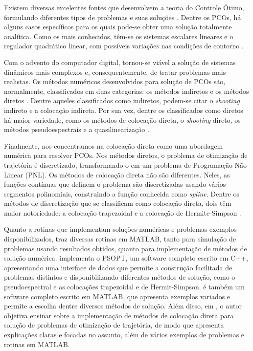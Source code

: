 
Existem diversas excelentes fontes que desenvolvem a teoria do Controle Ótimo, formulando diferentes tipos de problemas e suas soluções \cite{betts_practical_2010, kirk_optimal_2004, bryson_applied_2018, athans_optimal_2007}. Dentre os PCOs, há alguns casos específicos para os quais pode-se obter uma solução totalmente analítica. Como os mais conhecidos, têm-se os sistemas escalares lineares e o regulador quadrático linear, com possíveis variações nas condições de contorno \cite{lewis_optimal_2012}.


Com o advento do computador digital, tornou-se viável a solução de sistemas dinâmicos mais complexos e, consequentemente, de tratar problemas mais realistas. Os métodos numéricos desenvolvidos para solução de PCOs são, normalmente, classificados em duas categorias: os métodos indiretos e os métodos diretos \cite{betts_practical_2010}. Dentre aqueles classificados como indiretos, podem-se citar o \textit{shooting} indireto e a colocação indireta. Por sua vez, dentre os classificados como diretos há maior variedade, como os métodos de colocação direta, o \textit{shooting} direto, os métodos pseudoespectrais \cite{betts_survey_1998} e a quasilinearização \cite{paine_application_1967}. 



Finalmente, nos concentramos na colocação direta como uma abordagem numérica para resolver PCOs. Nos métodos diretos, o problema de otimização de trajetória é discretizado, transformando-o em um problema de Programação Não-Linear (PNL). Os métodos de colocação direta não são diferentes. Neles, as funções contínuas que definem o problema são discretizadas usando vários segmentos polinomiais, construindo a função conhecida como \textit{spline}. Dentre os métodos de discretização que se classificam como colocação direta, dois têm maior notoriedade: a colocação trapezoidal e a colocação de Hermite-Simpson \cite{kelly_introduction_2017, betts_practical_2010}.

Quanto a rotinas que implementam soluções numéricas e problemas exemplos disponibilizados, \cite{lewis_optimal_2012} traz diversas rotinas em MATLAB, tanto para simulação de problemas usando resultados obtidos, quanto para implementação de métodos de solução numérica. \cite{becerra_psopt_2022} implementa o PSOPT, um software completo escrito em C++, apresentando uma interface de dados que permite a construção facilitada de problemas distintos e disponibilizando diferentes métodos de solução, como o pseudoespectral e as colocações trapezoidal e de Hermit-Simpson. \cite{kelly_optimtraj_2022} é também um software completo escrito em MATLAB, que apresenta exemplos variados e permite a escolha dentre diversos métodos de solução. Além disso, em \cite{kelly_introduction_2017}, o autor objetiva ensinar sobre a implementação de métodos de colocação direta para solução de problemas de otimização de trajetória, de modo que apresenta explicações claras e focadas no assunto, além de vários exemplos de problemas e rotinas em MATLAB.


